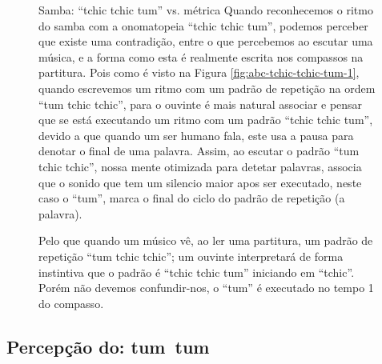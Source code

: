 \begin{figure}[!h]
\begin{elaboracion}{Samba: ``tchic tchic tum'' vs. métrica}
Quando reconhecemos o ritmo do samba com a onomatopeia ``tchic tchic tum'', 
podemos perceber que existe uma contradição, entre 
o que percebemos ao escutar uma música, e a forma como esta é realmente escrita nos compassos na partitura.
Pois como é visto na Figura \ref{fig:abc-tchic-tchic-tum-1}, quando escrevemos
um ritmo com um padrão de repetição na ordem ``tum tchic tchic'', 
para o ouvinte é mais natural associar e pensar
que se está executando um ritmo com um padrão ``tchic tchic tum'', 
devido a que quando um ser humano fala, este usa a pausa
para denotar o final de uma palavra. Assim, ao escutar o padrão ``tum tchic tchic'', 
nossa mente otimizada para detetar palavras,
associa que o sonido que tem um silencio maior apos ser executado,
neste caso o ``tum'', marca o final do ciclo do padrão de repetição (a palavra). 

Pelo que quando um músico vê, ao ler uma partitura, 
um padrão de repetição ``tum tchic tchic''; 
um ouvinte interpretará de forma instintiva que o padrão é ``tchic tchic tum'' iniciando em ``tchic''.
Porém não devemos confundir-nos, o ``tum'' é executado no tempo 1 do compasso.
\end{elaboracion}
\label{fig:RitmoVsFala}
\end{figure}

\subsection{Percepção do: tum~tum}

